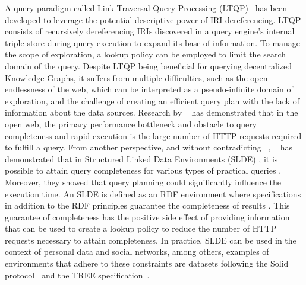 A query paradigm called Link Traversal Query Processing (LTQP)~\cite{Hartig2012} has been developed to leverage the potential descriptive power of IRI dereferencing.
LTQP consists of recursively dereferencing IRIs discovered in a query engine's internal triple store during query execution to expand its base of information.
To manage the scope of exploration, a lookup policy  can be employed to limit the search domain of the query.
Despite LTQP being beneficial for querying decentralized Knowledge Graphs,
it suffers from multiple difficulties, such as the open endlessness of the web, which can be interpreted as a pseudo-infinite domain of exploration,
and the challenge of creating an efficient query plan with the lack of information about the data sources.
Research by \citeauthor{hartig2016walking}~\cite{hartig2016walking} has demonstrated that in the open web, the primary performance bottleneck and obstacle to query completeness and rapid execution is the large number of HTTP requests required to fulfill a query.
From another perspective, and without contradicting \citeauthor{hartig2016walking}~\cite{hartig2016walking}, \citeauthor{Taelman2023}~\cite{Taelman2023} has demonstrated that in Structured Linked Data Environments (SLDE) ,
it is possible to attain query completeness for various types of practical queries .
Moreover, they showed that query planning could significantly influence the execution time.
An SLDE is defined as an RDF environment where specifications  in addition to the RDF principles  guarantee the completeness of results .
This guarantee of completeness has the positive side effect of providing information
that can be used to create a lookup policy to reduce the number of HTTP requests necessary to attain completeness.
In practice, SLDE can be used in the context of personal data and social networks, among others,
examples of environments that adhere to these constraints are datasets following the Solid protocol~\cite{Taelman2023} and the TREE specification~\cite{tam_iswc_traversalsensortree_2024}.
